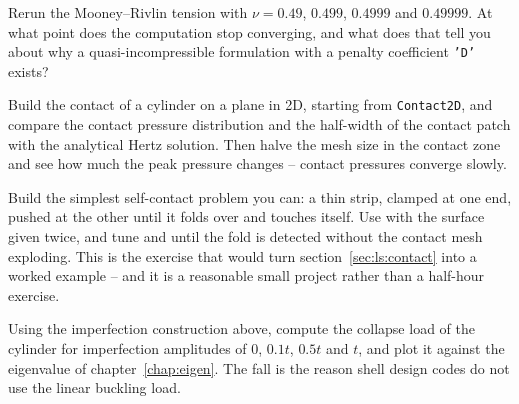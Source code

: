  Rerun the Mooney--Rivlin tension
  with $\nu = 0.49$, $0.499$, $0.4999$ and $0.49999$. At what point does the
  computation stop converging, and what does that tell you about why a
  quasi-incompressible formulation with a penalty coefficient \texttt{'D'}
  exists?

 Build the contact of a cylinder on a plane in
  2D, starting from \texttt{Contact2D}, and compare the contact pressure
  distribution and the half-width of the contact patch with the analytical
  Hertz solution. Then halve the mesh size in the contact zone and see how
  much the peak pressure changes -- contact pressures converge slowly.

 Build the simplest self-contact problem
  you can: a thin strip, clamped at one end, pushed at the other until it
  folds over and touches itself. Use  with the surface given
  twice, and tune  and  until the fold is detected without
  the contact mesh exploding. This is the exercise that would turn
  section~\ref{sec:ls:contact} into a worked example -- and it is a reasonable
  small project rather than a half-hour exercise.

 Using the
  imperfection construction above, compute the collapse load of the cylinder
  for imperfection amplitudes of $0$, $0.1t$, $0.5t$ and $t$, and plot it
  against the eigenvalue of chapter~\ref{chap:eigen}. The fall is the reason
  shell design codes do not use the linear buckling load.
